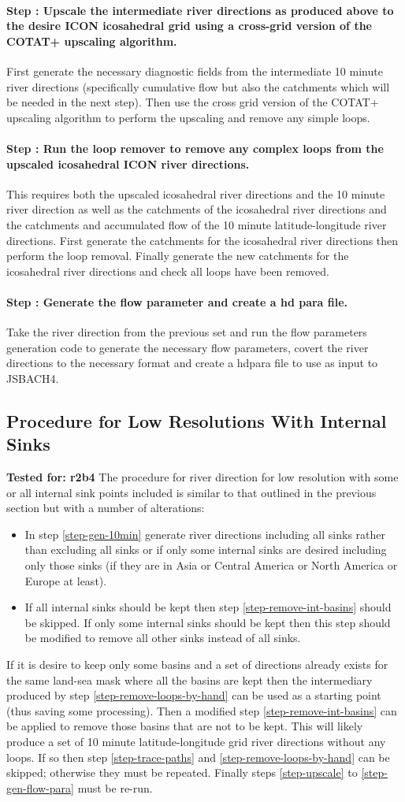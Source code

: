 \documentclass{article}
\newcounter{stepnum}[subsection]
\newcommand{\customstep}[2][]{ \refstepcounter{stepnum}\paragraph{Step \thestepnum\label{#1}: #2}}
\begin{document}
\customstep[step-upscale]{Upscale the intermediate river directions as produced above to the desire ICON icosahedral grid using a cross-grid version of the COTAT+ upscaling algorithm.} First generate the necessary diagnostic fields from the intermediate 10 minute river directions (specifically cumulative flow but also the catchments which will be needed in the next step). Then use the cross grid version of the COTAT+ upscaling algorithm to perform the upscaling and remove any simple loops.
\customstep{Run the loop remover to remove any complex loops from the upscaled icosahedral ICON river directions.} This requires both the upscaled icosahedral river directions and the 10 minute river direction as well as the catchments of the icosahedral river directions and the catchments and accumulated flow of the 10 minute latitude-longitude river directions. First generate the catchments for the icosahedral river directions then perform the loop removal. Finally generate the new catchments for the icosahedral river directions and check all loops have been removed.
\customstep[step-gen-flow-para]{Generate the flow parameter and create a hd para file.} Take the river direction from the previous set and run the flow parameters generation code to generate the necessary flow parameters, covert the river directions to the necessary format and create a hdpara file to use as input to JSBACH4.

\subsection{Procedure for Low Resolutions With Internal Sinks}
\noindent\textbf{Tested for: r2b4}
The procedure for river direction for low resolution with some or all internal sink points included is similar to that outlined in the previous section but with a number of alterations:
\begin{itemize}
\item In step \ref{step-gen-10min} generate river directions including all sinks rather than excluding all sinks or if only some internal sinks are desired including only those sinks (if they are in Asia or Central America or North America or Europe at least).
\item If all internal sinks should be kept then step \ref{step-remove-int-basins} should be skipped. If only some internal sinks should be kept then this step should be modified to remove all other sinks instead of all sinks.
\end{itemize}
If it is desire to keep only some basins and a set of directions already exists for the same land-sea mask where all the basins are kept then the intermediary produced by step \ref{step-remove-loops-by-hand} can be used as a starting point (thus saving some processing). Then a modified step \ref{step-remove-int-basins}  can be applied to remove those basins that are not to be kept. This will likely produce a set of 10 minute latitude-longitude grid river directions without any loops. If so then step \ref{step-trace-paths} and \ref{step-remove-loops-by-hand} can be skipped; otherwise they must be repeated. Finally steps \ref{step-upscale} to \ref{step-gen-flow-para} must be re-run.
\end{document}
